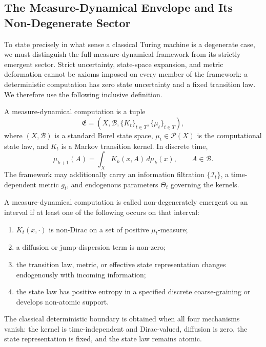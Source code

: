 
\subsection{The Measure-Dynamical Envelope and Its Non-Degenerate Sector}

To state precisely in what sense a classical Turing machine is a degenerate
case, we must distinguish the full measure-dynamical framework from its
strictly emergent sector.  Strict uncertainty, state-space expansion, and
metric deformation cannot be axioms imposed on every member of the framework:
a deterministic computation has zero state uncertainty and a fixed transition
law.  We therefore use the following inclusive definition.

\begin{definition}
 A measure-dynamical computation is a tuple
 \[
   \mathfrak E=(X,\mathcal B,\{K_t\}_{t\in T},\{\mu_t\}_{t\in T}),
 \]
 where $(X,\mathcal B)$ is a standard Borel state space,
 $\mu_t\in\mathcal P(X)$ is the computational state law, and $K_t$ is a
 Markov transition kernel.  In discrete time,
 \[
   \mu_{k+1}(A)=\int_X K_k(x,A)\,d\mu_k(x),
   \qquad A\in\mathcal B.
 \]
 The framework may additionally carry an information filtration
 $\{\mathcal I_t\}$, a time-dependent metric $g_t$, and endogenous parameters
 $\Theta_t$ governing the kernels.
\end{definition}

\begin{definition}
 A measure-dynamical computation is called non-degenerately emergent on an
 interval if at least one of the following occurs on that interval:
 \begin{enumerate}
   \item $K_t(x,\cdot)$ is non-Dirac on a set of positive $\mu_t$-measure;
   \item a diffusion or jump-dispersion term is non-zero;
   \item the transition law, metric, or effective state representation changes
         endogenously with incoming information;
   \item the state law has positive entropy in a specified discrete
         coarse-graining or develops non-atomic support.
 \end{enumerate}
 The classical deterministic boundary is obtained when all four mechanisms
 vanish: the kernel is time-independent and Dirac-valued, diffusion is zero,
 the state representation is fixed, and the state law remains atomic.
\end{definition}

